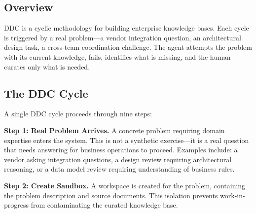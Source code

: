 \documentclass[11pt,a4paper]{article}
\begin{document}
\subsection{Overview}

DDC is a cyclic methodology for building enterprise knowledge bases. Each cycle is triggered by a real problem---a vendor integration question, an architectural design task, a cross-team coordination challenge. The agent attempts the problem with its current knowledge, fails, identifies what is missing, and the human curates only what is needed.

%

\subsection{The DDC Cycle}

A single DDC cycle proceeds through nine steps:

\textbf{Step 1: Real Problem Arrives.} A concrete problem requiring domain expertise enters the system. This is not a synthetic exercise---it is a real question that needs answering for business operations to proceed. Examples include: a vendor asking integration questions, a design review requiring architectural reasoning, or a data model review requiring understanding of business rules.

\textbf{Step 2: Create Sandbox.} A workspace is created for the problem, containing the problem description and source documents. This isolation prevents work-in-progress from contaminating the curated knowledge base.
\end{document}
